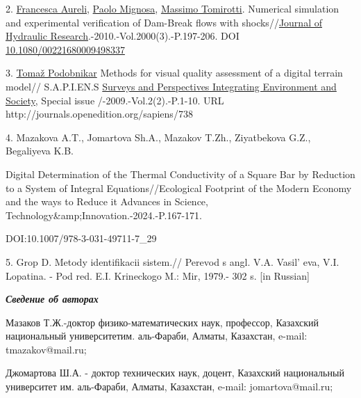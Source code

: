 2.
\href{https://www.researchgate.net/profile/Francesca-Aureli?_tp=eyJjb250ZXh0Ijp7ImZpcnN0UGFnZSI6InB1YmxpY2F0aW9uIiwicGFnZSI6InB1YmxpY2F0aW9uIn19}{Francesca
Aureli},
\href{https://www.researchgate.net/profile/Paolo-Mignosa?_tp=eyJjb250ZXh0Ijp7ImZpcnN0UGFnZSI6InB1YmxpY2F0aW9uIiwicGFnZSI6InB1YmxpY2F0aW9uIn19}{Paolo
Mignosa},
\href{https://www.researchgate.net/profile/Massimo-Tomirotti?_tp=eyJjb250ZXh0Ijp7ImZpcnN0UGFnZSI6InB1YmxpY2F0aW9uIiwicGFnZSI6InB1YmxpY2F0aW9uIn19}{Massimo
Tomirotti}. Numerical simulation and experimental verification of
Dam-Break flows with
shocks//\href{https://www.researchgate.net/journal/Journal-of-Hydraulic-Research-1814-2079?_tp=eyJjb250ZXh0Ijp7ImZpcnN0UGFnZSI6InB1YmxpY2F0aW9uIiwicGFnZSI6InB1YmxpY2F0aW9uIn19}{Journal
of Hydraulic Research}.-2010.-Vol.2000(3).-P.197-206. DOI
\href{http://dx.doi.org/10.1080/00221680009498337}{10.1080/00221680009498337}

3.
\href{https://www.researchgate.net/profile/Tomaz-Podobnikar?_tp=eyJjb250ZXh0Ijp7ImZpcnN0UGFnZSI6InB1YmxpY2F0aW9uIiwicGFnZSI6InB1YmxpY2F0aW9uIn19}{Tomaž
Podobnikar} Methods for visual quality assessment of a digital terrain
model// S.A.P.I.EN.S
\href{https://www.researchgate.net/journal/Surveys-and-Perspectives-Integrating-Environment-and-Society-1993-3819?_tp=eyJjb250ZXh0Ijp7ImZpcnN0UGFnZSI6InB1YmxpY2F0aW9uIiwicGFnZSI6InB1YmxpY2F0aW9uIn19}{Surveys
and Perspectives Integrating Environment and Society}, Special issue
/-2009.-Vol.2(2).-P.1-10. URL
http://journals.openedition.org/sapiens/738

4. Mazakova A.T., Jomartova Sh.A., Mazakov T.Zh., Ziyatbekova G.Z.,
Begaliyeva K.B.

Digital Determination of the Thermal Conductivity of a Square Bar by
Reduction to a System of Integral Equations//Ecological Footprint of the
Modern Economy and the ways to Reduce it Advances in Science,
Technology\&amp;Innovation.-2024.-P.167-171.

DOI:10.1007/978-3-031-49711-7\_29

5. Grop D. Metody identifikacii sistem.// Perevod s angl. V.A.
Vasil' eva, V.I. Lopatina. - Pod red. E.I. Krineckogo M.:
Mir, 1979.- 302 s. {[}in Russian{]}

\emph{{\bfseries Сведение об авторах}}

Мазаков Т.Ж.-доктор физико-математических наук, профессор, Казахский
национальный университетим. аль-Фараби, Алматы, Казахстан, e-mail:
tmazakov@mail.ru;

Джомартова Ш.А. - доктор технических наук, доцент, Казахский
национальный университет им. аль-Фараби, Алматы, Казахстан, e-mail:
jomartova@mail.ru;

